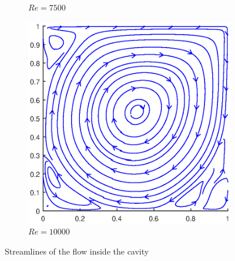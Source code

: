 \begin{figure}
\begin{subfigure}{0.5\textwidth}
		\caption{$Re=7500$}
	\end{subfigure}
	\begin{subfigure}{0.5\textwidth}
		\includegraphics[scale=0.61]{DrivenCavity/10000}
		\caption{$Re=10000$}
	\end{subfigure}
	\caption{Streamlines of the flow inside the cavity}
\end{figure}